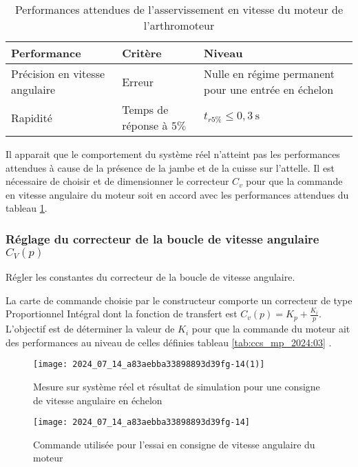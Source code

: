 \begin{table}[!h]
\centering
\begin{tabular}{llp{6cm}}
\hline
\textbf{Performance} & \textbf{Critère} & \textbf{Niveau} \\
\hline
Précision en vitesse angulaire & Erreur & Nulle en régime permanent pour une entrée en échelon \\
Rapidité & Temps de réponse à $5 \%$ & $t_{r 5 \%} \leqslant 0,3 \mathrm{~s}$ \\
\hline
\end{tabular}
\caption{\label{tab:ccs_mp_2024:02} Performances attendues de l'asservissement en vitesse du moteur de l'arthromoteur}
\end{table}




Il apparait que le comportement du système réel n'atteint pas les performances attendues à cause de la présence de la jambe et de la cuisse sur l'attelle. Il est nécessaire de choisir et de dimensionner le correcteur $C_{v}$ pour que la commande en vitesse angulaire du moteur soit en accord avec les performances attendues du tableau \ref{tab:ccs_mp_2024:02}.

\subsubsection{Réglage du correcteur de la boucle de vitesse angulaire $C_{V}(p)$}
\begin{obj}
Régler les constantes du correcteur de la boucle de vitesse angulaire.
\end{obj}

La carte de commande choisie par le constructeur comporte un correcteur de type Proportionnel Intégral dont la fonction de transfert est $C_{v}(p)=K_{p}+\frac{K_{i}}{p}$. L'objectif est de déterminer la valeur de $K_{i}$ pour que la commande du moteur ait des performances au niveau de celles définies tableau \ref{tab:ccs_mp_2024:03} .

\begin{figure}[!h]\centering
\texttt{[image: 2024\_07\_14\_a83aebba33898893d39fg-14(1)]}
\caption{\label{fig:ccs_mp_2024:fig:23}Mesure sur système réel et résultat de simulation pour une consigne de vitesse angulaire en échelon}
\end{figure}
\begin{figure}[!h]\centering
\texttt{[image: 2024\_07\_14\_a83aebba33898893d39fg-14]}
\caption{\label{fig:ccs_mp_2024:fig:24}Commande utilisée pour l'essai en consigne de vitesse angulaire du moteur}
\end{figure}

